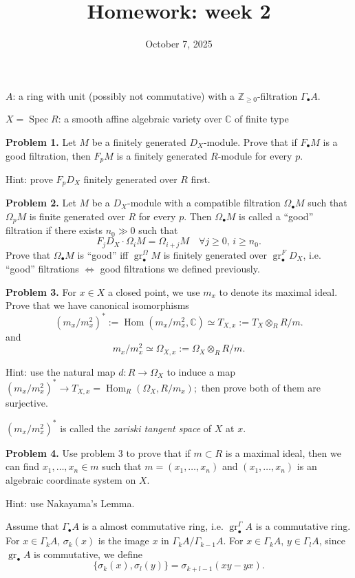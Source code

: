 \documentclass[12pt]{article}
\title{Homework: week 2}
\date{October 7, 2025}
\begin{document}
\maketitle

\bigskip
$A$: a ring with unit (possibly not commutative) with a $\mathbb{Z}_{\ge 0}$-filtration $\Gamma_\bullet A$.

$X=\operatorname{Spec}R$: a smooth affine algebraic variety over $\mathbb{C}$ of finite type

\bigskip
\noindent
\textbf{Problem 1.} Let $M$ be a finitely generated $D_X$-module. Prove that if $F_\bullet M$ is a good
filtration, then $F_p M$ is a finitely generated $R$-module for every $p$.

\bigskip
\noindent
Hint: prove $F_p D_X$ finitely generated over $R$ first.

\bigskip
\noindent
\textbf{Problem 2.} Let $M$ be a $D_X$-module with a compatible filtration $\Omega_\bullet M$ such that $\Omega_p M$ is
finite generated over $R$ for every $p$. Then $\Omega_\bullet M$ is called a ``good'' filtration if there exists
$n_0 \gg 0$ such that
\[
F_j D_X\cdot \Omega_i M = \Omega_{i+j} M \quad \forall j \ge 0,\, i \ge n_0.
\]
Prove that $\Omega_\bullet M$ is ``good'' iff $\operatorname{gr}^\Omega_\bullet M$ is finitely generated over $\operatorname{gr}^F_\bullet D_X$,
i.e. ``good'' filtrations $\Longleftrightarrow$ good filtrations we defined previously.

\bigskip
\noindent
\textbf{Problem 3.} For $x \in X$ a closed point, we use $m_x$ to denote its maximal ideal. Prove that
we have canonical isomorphisms
\[
(m_x/m_x^2)^* := \operatorname{Hom}(m_x/m_x^2,\mathbb{C}) \simeq T_{X,x} := T_X \otimes_R R/m.
\]
and
\[
 m_x/m_x^2 \simeq \Omega_{X,x} := \Omega_X \otimes_R R/m.
\]

\bigskip
\noindent
Hint: use the natural map $d:R\to \Omega_X$ to induce a map $(m_x/m_x^2)^* \to T_{X,x} = \operatorname{Hom}_R(\Omega_X,R/m_x);$
then prove both of them are surjective.

\noindent
$(m_x/m_x^2)^*$ is called the \emph{zariski tangent space} of $X$ at $x$.

\bigskip
\noindent
\textbf{Problem 4.} Use problem 3 to prove that if $m \subset R$ is a maximal ideal, then we can find
$x_1,\ldots,x_n \in m$ such that $m = (x_1,\ldots,x_n)$ and $(x_1,\ldots,x_n)$ is an algebraic coordinate system
on $X$.

\bigskip
\noindent
Hint: use Nakayama's Lemma.

Assume that $\Gamma_\bullet A$ is a almost commutative ring, i.e. $\operatorname{gr}^\Gamma_\bullet A$ is a commutative ring. For
$x \in \Gamma_k A$, $\sigma_k(x)$ is the image $x$ in $\Gamma_k A/\Gamma_{k-1}A$. For $x \in \Gamma_k A$, $y \in \Gamma_l A$, since $\operatorname{gr}_\bullet A$ is commutative,
we define
\[
\{\sigma_k(x),\sigma_l(y)\} = \sigma_{k+l-1}(xy - yx).
\]
\end{document}
